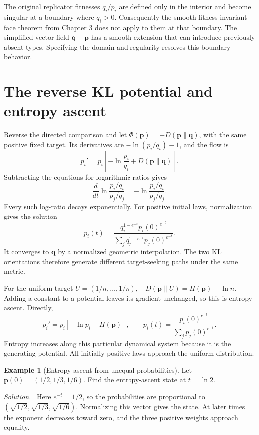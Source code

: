 \documentclass[11pt,oneside,openany]{book}
\theoremstyle{definition}
\newtheorem{example}{Example}[chapter]
\theoremstyle{remark}
\newenvironment{solution}{\par\smallskip\noindent\textit{Solution.}\ }{\par\smallskip}
\newcommand{\p}{\mathbf{p}}
\newcommand{\q}{\mathbf{q}}
\numberwithin{equation}{chapter}
\begin{document}
The original replicator fitnesses $q_i/p_i$ are defined only in the interior and become singular at a boundary where $q_i>0$. Consequently the smooth-fitness invariant-face theorem from Chapter 3 does not apply to them at that boundary. The simplified vector field $\q-\p$ has a smooth extension that can introduce previously absent types. Specifying the domain and regularity resolves this boundary behavior.

\section{The reverse KL potential and entropy ascent}
Reverse the directed comparison and let $\Phi(\p)=-D(\p\|\q)$, with the same positive fixed target. Its derivatives are $-\ln(p_i/q_i)-1$, and the flow is
\[
p_i'=p_i\left[-\ln\frac{p_i}{q_i}+D(\p\|\q)\right].
\]
Subtracting the equations for logarithmic ratios gives
\[
\frac{d}{dt}\ln\frac{p_i/q_i}{p_j/q_j}
=-\ln\frac{p_i/q_i}{p_j/q_j}.
\]
Every such log-ratio decays exponentially. For positive initial laws, normalization gives the solution
\begin{equation}\label{eq:reverseklflow}
p_i(t)=\frac{q_i^{1-e^{-t}}p_i(0)^{e^{-t}}}
{\sum_jq_j^{1-e^{-t}}p_j(0)^{e^{-t}}}.
\end{equation}
It converges to $\q$ by a normalized geometric interpolation. The two KL orientations therefore generate different target-seeking paths under the same metric.

For the uniform target $U=(1/n,\ldots,1/n)$, $-D(\p\|U)=H(\p)-\ln n$. Adding a constant to a potential leaves its gradient unchanged, so this is entropy ascent. Directly,
\begin{equation}\label{eq:entropyflow}
p_i'=p_i[-\ln p_i-H(\p)],\qquad
p_i(t)=\frac{p_i(0)^{e^{-t}}}{\sum_jp_j(0)^{e^{-t}}}.
\end{equation}
Entropy increases along this particular dynamical system because it is the generating potential. All initially positive laws approach the uniform distribution.

\begin{example}[Entropy ascent from unequal probabilities]
Let $\p(0)=(1/2,1/3,1/6)$. Find the entropy-ascent state at $t=\ln2$.
\begin{solution}
Here $e^{-t}=1/2$, so the probabilities are proportional to $(\sqrt{1/2},\sqrt{1/3},\sqrt{1/6})$. Normalizing this vector gives the state. At later times the exponent decreases toward zero, and the three positive weights approach equality.
\end{solution}
\end{example}
\end{document}
